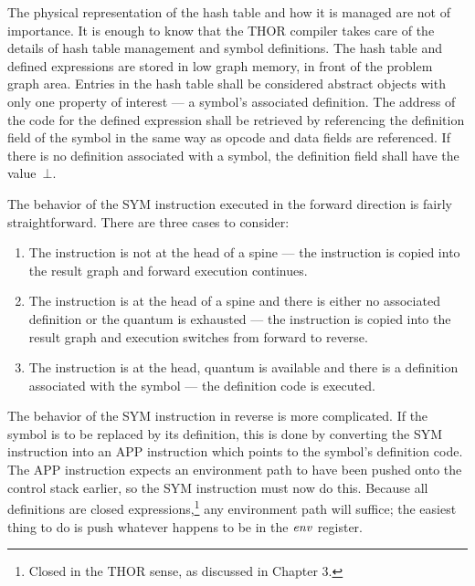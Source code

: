 The physical representation of the hash table and how it is managed are not of importance.
It is enough to know that the THOR compiler takes care of the details of hash table
management and symbol definitions. The hash table and defined expressions are stored in
low graph memory, in front of the problem graph area. Entries in the hash table shall be
considered abstract objects with only one property of interest --- a symbol's associated
definition. The address of the code for the defined expression shall be retrieved by
referencing the definition field of the symbol in the same way as opcode and data fields
are referenced. If there is no definition associated with a symbol, the definition field shall have
the value~\(\bot\).

The behavior of the SYM instruction executed in the forward direction is fairly
straightforward. There are three cases to consider:

\begin{enumerate}
\item The instruction is not at the head of a spine --- the instruction is copied into the result graph and forward execution continues.

\item The instruction is at the head of a spine and there is either no associated definition or the quantum is exhausted --- the instruction is copied into the result graph and execution switches from forward to reverse.

\item The instruction is at the head, quantum is available and there is a definition associated with the symbol --- the definition code is executed.
\end{enumerate}

The behavior of the SYM instruction in reverse is more complicated. If the symbol is to
be replaced by its definition, this is done by converting the SYM instruction into an APP
instruction which points to the symbol's definition code. The APP instruction expects an
environment path to have been pushed onto the control stack earlier, so the SYM instruction
must now do this. Because all definitions are closed expressions,\footnote{Closed in the
THOR sense, as discussed in Chapter 3.} any environment path will suffice; the easiest
thing to do is push whatever happens to be in the \(\mathit{env}\) register.


